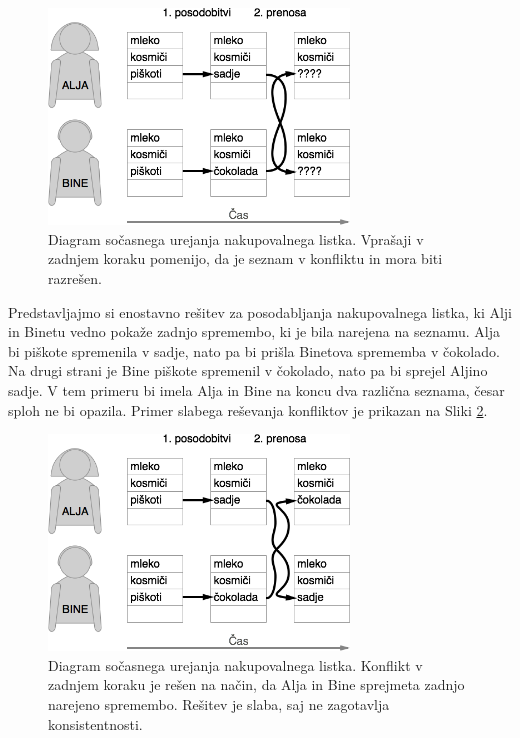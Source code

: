 \documentclass[a4paper, 12pt, twoside]{book}
\begin{document}
\begin{figure}[placement h]
\begin{center}
\includegraphics[width=8cm]{problem2.png}
\end{center}
\caption{Diagram sočasnega urejanja nakupovalnega listka. Vprašaji v zadnjem koraku pomenijo, da je seznam v konfliktu in mora biti razrešen. }
\label{problem2}
\end{figure}

\pagebreak

Predstavljajmo si enostavno rešitev za posodabljanja nakupovalnega listka, ki Alji in Binetu vedno pokaže zadnjo spremembo, ki je bila narejena na seznamu. Alja bi piškote spremenila v sadje, nato pa bi prišla Binetova sprememba v čokolado. Na drugi strani je Bine piškote spremenil v čokolado, nato pa bi sprejel Aljino sadje. V tem primeru bi imela Alja in Bine na koncu dva različna seznama, česar sploh ne bi opazila. Primer slabega reševanja konfliktov je prikazan na Sliki \ref{problem3}.

\begin{figure}[placement h]
\begin{center}
\includegraphics[width=8cm]{problem3.png}
\end{center}
\caption{Diagram sočasnega urejanja nakupovalnega listka. Konflikt v zadnjem koraku je rešen na način, da Alja in Bine sprejmeta zadnjo narejeno spremembo. Rešitev je slaba, saj ne zagotavlja konsistentnosti. }
\label{problem3}
\end{figure}
\end{document}
